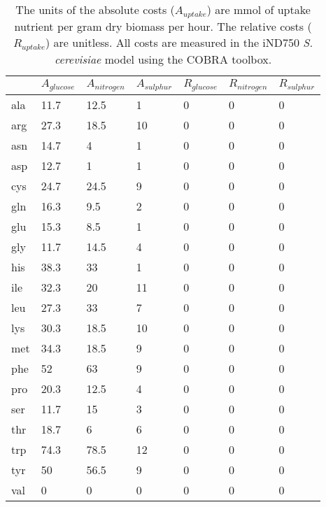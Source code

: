 \begin{table}
\begin{footnotesize}
  \begin{tabular}{ p{1cm} *{6}{p{1.9cm}} }
  \toprule
      & $A_{glucose}$ & $A_{nitrogen}$ & $A_{sulphur}$ & $R_{glucose} $ & $R_{nitrogen}$ & $R_{sulphur}$ \\ \midrule
      ala & 11.7 & 12.5 & 1  & 0 & 0 & 0 \\
      arg & 27.3 & 18.5 & 10 & 0 & 0 & 0 \\
      asn & 14.7 & 4    & 1  & 0 & 0 & 0 \\
      asp & 12.7 & 1    & 1  & 0 & 0 & 0 \\
      cys & 24.7 & 24.5 & 9  & 0 & 0 & 0 \\
      gln & 16.3 & 9.5  & 2  & 0 & 0 & 0 \\
      glu & 15.3 & 8.5  & 1  & 0 & 0 & 0 \\
      gly & 11.7 & 14.5 & 4  & 0 & 0 & 0 \\
      his & 38.3 & 33   & 1  & 0 & 0 & 0 \\
      ile & 32.3 & 20   & 11 & 0 & 0 & 0 \\
      leu & 27.3 & 33   & 7  & 0 & 0 & 0 \\
      lys & 30.3 & 18.5 & 10 & 0 & 0 & 0 \\
      met & 34.3 & 18.5 & 9  & 0 & 0 & 0 \\
      phe & 52   & 63   & 9  & 0 & 0 & 0 \\
      pro & 20.3 & 12.5 & 4  & 0 & 0 & 0 \\
      ser & 11.7 & 15   & 3  & 0 & 0 & 0 \\
      thr & 18.7 & 6    & 6  & 0 & 0 & 0 \\
      trp & 74.3 & 78.5 & 12 & 0 & 0 & 0 \\
      tyr & 50   & 56.5 & 9  & 0 & 0 & 0 \\
      val & 0    & 0    & 0  & 0 & 0 & 0 \\ \bottomrule
  \end{tabular}
\end{footnotesize}
\caption[\emph{S. cerevisiae} estimated absolute and relative amino acid costs]{The units of the absolute costs ($A_{uptake}$) are mmol of uptake nutrient per gram dry biomass per hour. The relative costs ($R_{uptake}$) are unitless. All costs are measured in the iND750 \emph{S. cerevisiae} model using the COBRA toolbox.} 
\label{table:estimated_costs}
\end{table}

